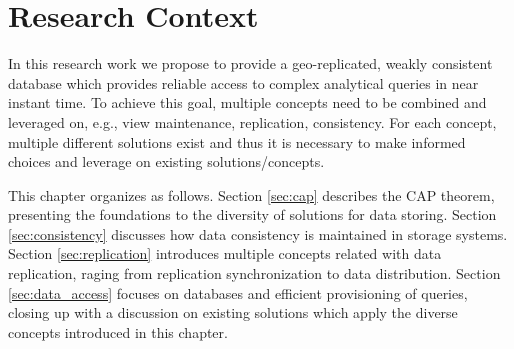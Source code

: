 
%

\chapter{Research Context}


In this research work we propose to provide a geo-replicated, weakly consistent database which provides reliable access to complex analytical queries in near instant time.
To achieve this goal, multiple concepts need to be combined and leveraged on, e.g., view maintenance, replication, consistency.
For each concept, multiple different solutions exist and thus it is necessary to make informed choices and leverage on existing solutions/concepts.

This chapter organizes as follows.
Section \ref{sec:cap} describes the CAP theorem, presenting the foundations to the diversity of solutions for data storing.
Section \ref{sec:consistency} discusses how data consistency is maintained in storage systems.
Section \ref{sec:replication} introduces multiple concepts related with data replication, raging from replication synchronization to data distribution. Section
\ref{sec:data_access} focuses on databases and efficient provisioning of queries, closing up with a discussion on existing solutions which apply the diverse concepts introduced in this chapter.





